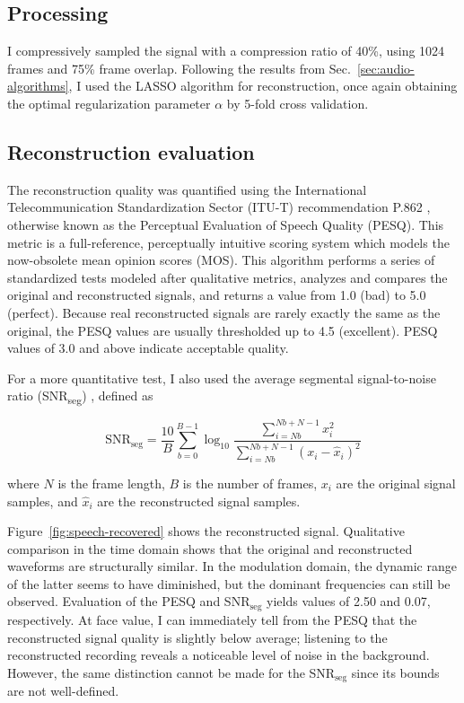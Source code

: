 \subsection{Processing}
\label{ssec:audio-speech-process}
I compressively sampled the signal with a compression ratio of 40\%, using 1024 frames and 75\% frame overlap. Following the results from Sec.~\ref{sec:audio-algorithms}, I used the LASSO algorithm for reconstruction, once again obtaining the optimal regularization parameter $\alpha$ by 5-fold cross validation.

\subsection{Reconstruction evaluation}
\label{ssec:audio-speech-metric}
The reconstruction quality was quantified using the International Telecommunication Standardization Sector (ITU-T) recommendation P.862 \cite{pesq}, otherwise known as the Perceptual Evaluation of Speech Quality (PESQ). This metric is a full-reference, perceptually intuitive scoring system which models the now-obsolete mean opinion scores (MOS). This algorithm performs a series of standardized tests modeled after qualitative metrics, analyzes and compares the original and reconstructed signals, and returns a value from 1.0 (bad) to 5.0 (perfect). Because real reconstructed signals are rarely exactly the same as the original, the PESQ values are usually thresholded up to 4.5 (excellent). PESQ values of 3.0 and above indicate acceptable quality.

For a more quantitative test, I also used the average segmental signal-to-noise ratio (SNR\textsubscript{seg}) \cite{Loizou2013}, defined as

\begin{equation}
\label{eq:snrseg}
\mathrm{SNR_{seg}} = \frac{10}{B} \sum_{b=0}^{B-1} \log_{10} \frac{\sum_{i = Nb}^{Nb + N - 1} x_i^2}{\sum_{i = Nb}^{Nb + N - 1} (x_i - \hat{x}_i)^2}
\end{equation}

\noindent where $N$ is the frame length, $B$ is the number of frames, $x_i$ are the original signal samples, and $\hat{x}_i$ are the reconstructed signal samples.

Figure~\ref{fig:speech-recovered} shows the reconstructed signal. Qualitative comparison in the time domain shows that the original and reconstructed waveforms are structurally similar. In the modulation domain, the dynamic range of the latter seems to have diminished, but the dominant frequencies can still be observed. Evaluation of the PESQ and SNR$_\mathrm{seg}$ yields values of 2.50 and 0.07, respectively. At face value, I can immediately tell from the PESQ that the reconstructed signal quality is slightly below average; listening to the reconstructed recording reveals a noticeable level of noise in the background. However, the same distinction cannot be made for the SNR$_\mathrm{seg}$ since its bounds are not well-defined.

